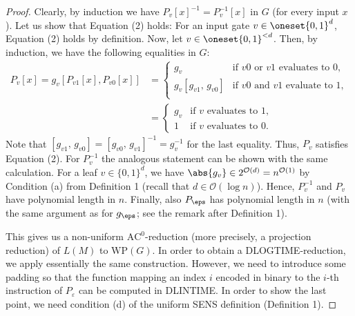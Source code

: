 \begin{proof}
  Clearly, by induction we have $ P_v[x]^{-1} = P_v^{-1}[x]$ in $G$ (for every input $x$). Let us
  show that Equation (2) holds: For an input gate
  $v \in \oneset{0,1}^{d}$, Equation (2) holds by definition. Now, let
  $v \in \oneset{0,1}^{< d}$. Then, by induction, we have the following equalities in $G$:
  \begin{align*}
    P_v[x] = g_v  [P_{v1}[x], P_{v0}[x]]
    &= 	\begin{cases}
      g_v  & \text{if } v0 \text{ or }  v1 \text{ evaluates to } 0, \\
      g_v [ g_{v1},\,  g_{v0} ] & \text{if } v0 \text{ and }  v1 \text{ evaluate to } 1, \\
    \end{cases}\\
    &= 	\begin{cases}
      g_v  & \text{if } v \text{ evaluates to } 1, \\
      1 & \text{if } v \text{ evaluates to } 0.		
    \end{cases}
  \end{align*}
  Note that $[ g_{v1},\,  g_{v0}] = [ g_{v0},\,  g_{v1}]^{-1} = g_v^{-1}$ for the last equality.
  Thus, $P_v$ satisfies Equation (2). For $P_v^{-1}$ the analogous
  statement can be shown with the same calculation. 
  For a leaf $v \in \{0,1\}^d$, we have $\abs{g_v} \in 2^{\mathcal{O}(d)} = n^{\mathcal{O}(1)}$
  by Condition (a) from Definition 1 (recall that $d \in \mathcal{O}(\log n)$).
  Hence, $P_v^{-1}$ and $P_v$ have polynomial
  length in $n$. Finally, also $P_\eps$ has polynomial length in $n$ (with the same
  argument as for $g_\eps$; see the remark after Definition 1).

This gives us a non-uniform $\mathrm{AC}^0$-reduction (more precisely, a projection reduction) of $L(M)$ to $\mathrm{WP}(G)$. In order to obtain a DLOGTIME-reduction, we apply essentially the same construction. However, we need to introduce some padding so that the function mapping an index $i$ encoded in binary to the $i$-th instruction of $P_\varepsilon$ can be computed in DLINTIME. In order to show the last point, we need condition (d) of the uniform SENS definition (Definition 1).
\end{proof}
